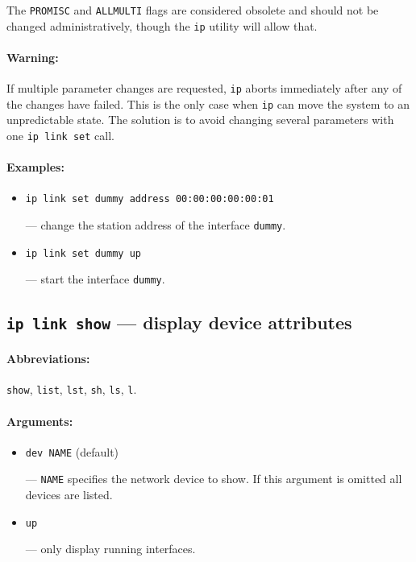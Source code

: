 \vskip 1mm
\begin{NB}
The \verb|PROMISC| and \verb|ALLMULTI| flags are considered
obsolete and should not be changed administratively, though
the {\tt ip} utility will allow that.
\end{NB}

\paragraph{Warning:} If multiple parameter changes are requested,
\verb|ip| aborts immediately after any of the changes have failed.
This is the only case when \verb|ip| can move the system to
an unpredictable state. The solution is to avoid changing
several parameters with one {\tt ip link set} call.

\paragraph{Examples:}
\begin{itemize}
\item \verb|ip link set dummy address 00:00:00:00:00:01|

--- change the station address of the interface \verb|dummy|.

\item \verb|ip link set dummy up|

--- start the interface \verb|dummy|.

\end{itemize}


\subsection{{\tt ip link show} --- display device attributes}
\label{IP-LINK-SHOW}

\paragraph{Abbreviations:} \verb|show|, \verb|list|, \verb|lst|, \verb|sh|, \verb|ls|,
\verb|l|.

\paragraph{Arguments:}
\begin{itemize}
\item \verb|dev NAME| (default)

--- \verb|NAME| specifies the network device to show.
If this argument is omitted all devices are listed.

\item \verb|up|

--- only display running interfaces.

\end{itemize}


